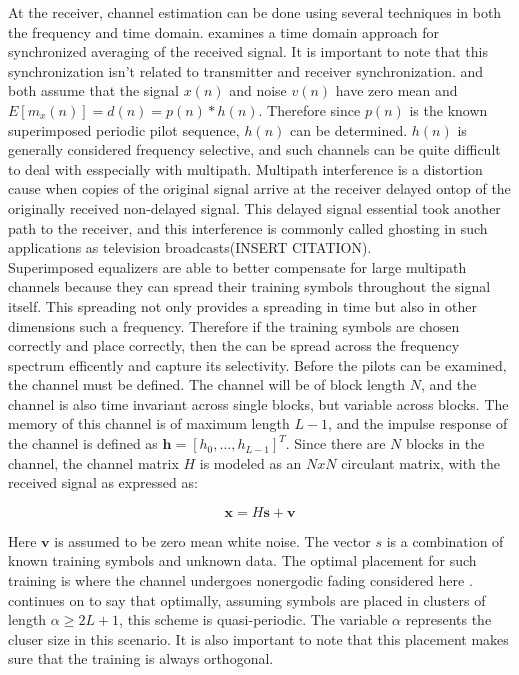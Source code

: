 At the receiver, channel estimation can be done using several techniques in both the frequency and time domain.  \cite{17} examines a time domain approach for synchronized averaging of the received signal.  It is important to note that this synchronization isn't related to transmitter and receiver synchronization.  \cite{17} and \cite{18} both assume that the signal \( x(n)\) and noise \( v(n) \) have zero mean and \(E[m_{x}(n)] = d(n) = p(n) \ast h(n)\).  Therefore since \(p(n) \) is the known superimposed periodic pilot sequence, \(h(n)\) can be determined.  \(h(n)\) is generally considered frequency selective, and such channels can be quite difficult to deal with esspecially with multipath.  Multipath interference is a distortion cause when copies of the original signal arrive at the receiver delayed ontop of the originally received non-delayed signal.  This delayed signal essential took another path to the receiver, and this interference is commonly called ghosting in such applications as television broadcasts(INSERT CITATION).\\

Superimposed equalizers are able to better compensate for large multipath channels because they can spread their training symbols throughout the signal itself.  This spreading not only provides a spreading in time but also in other dimensions such a frequency.  Therefore if the training symbols are chosen correctly and place correctly, then the can be spread across the frequency spectrum efficently and capture its selectivity.  Before the pilots can be examined, the channel must be defined.  The channel will be of block length \(N\), and the channel is also time invariant across single blocks, but variable across blocks.  The memory of this channel is of maximum length \(L-1\), and the impulse response of the channel is defined as \(\textbf{h}=[h_{0},...,h_{L-1}]^{T}\).  Since there are \(N\) blocks in the channel, the channel matrix \(H\) is modeled as an \(N x N\) circulant matrix, with the received signal as expressed as:

\[ \textbf{x}=\textit{H}\textbf{s}+\textbf{v}  \]

Here \(\textbf{v}\) is assumed to be zero mean white noise.  The vector \(s\) is a combination of known training symbols and unknown data.  The optimal placement for such training is where the channel undergoes nonergodic fading considered here \cite{20}.  \cite{16} continues on to say that optimally, assuming symbols are placed in clusters of length \(\alpha \ge 2L+1\), this scheme is quasi-periodic.  The variable \(\alpha\) represents the cluser size in this scenario.  It is also important to note that this placement makes sure that the training is always orthogonal.\\

